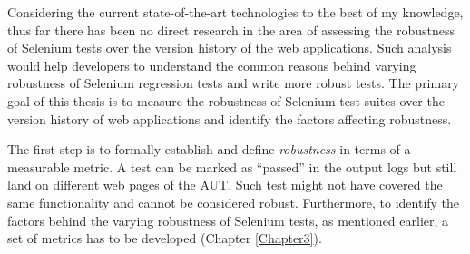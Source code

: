
Considering the current state-of-the-art technologies to the best of my knowledge, thus far there has been no direct research in the area of assessing the robustness of Selenium tests over the version history of the web applications. Such analysis would help developers to understand the common reasons behind varying robustness of Selenium regression tests and write more robust tests. The primary goal of this thesis is to measure the robustness of Selenium test-suites over the version history of web applications and identify the factors affecting robustness. 





The first step is to formally establish and define \textit{robustness} in terms of a measurable metric. A test can be marked as ``passed'' in the output logs but still land on different web pages of the AUT. Such test might not have covered the same functionality and cannot be considered robust. Furthermore, to identify the factors behind the varying robustness of Selenium tests, as mentioned earlier, a set of metrics has to be developed (Chapter \ref{Chapter3}). 

